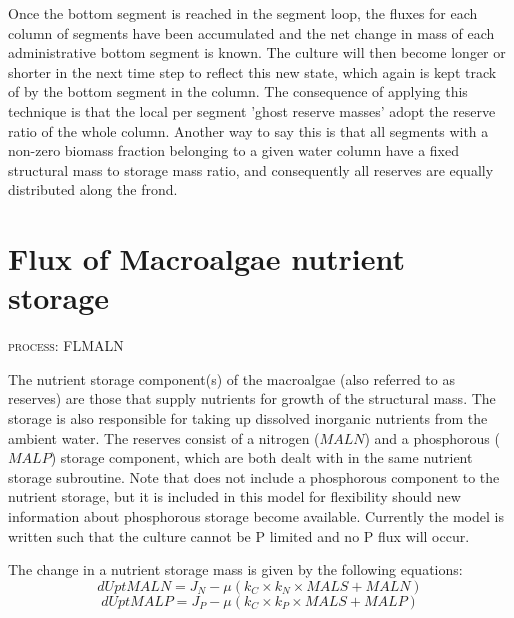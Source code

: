 \documentclass{deltares_manual}
\begin{document}
Once the bottom segment is reached in the segment loop, the fluxes for each column of segments have been accumulated and the net change in mass of each administrative bottom segment is known. The culture will then become longer or shorter in the next time step to reflect this new state, which again is kept track of by the bottom segment in the column. The consequence of applying this technique is that the local per segment 'ghost reserve masses' adopt the reserve ratio of the whole column. Another way to say this is that all segments with a non-zero biomass fraction belonging to a given water column have a fixed structural mass to storage mass ratio, and consequently all reserves are equally distributed along the frond.
\pagebreak

\section{Flux of Macroalgae nutrient storage}
\begin{flushright}
\textsc{process: FLMALN}
\end{flushright}

The nutrient storage component(s) of the macroalgae (also referred to as reserves) are those that supply nutrients for growth of the structural mass. The storage is also responsible for taking up dissolved inorganic nutrients from the ambient water. The reserves consist of a nitrogen ($MALN$) and a phosphorous ($MALP$) storage component, which are both dealt with in the same nutrient storage subroutine. Note that \cite{broch2012} does not include a phosphorous component to the nutrient storage, but it is included in this model for flexibility should new information about phosphorous storage become available. Currently the model is written such that the culture cannot be P limited and no P flux will occur.

The change in a nutrient storage mass is given by the following equations:
\begin{equation}
dUptMALN = J_N - \mu(k_C \times k_N \times MALS + MALN)
\end{equation}
\begin{equation}
dUptMALP = J_P - \mu(k_C \times k_P \times MALS + MALP)
\end{equation}
\end{document}
